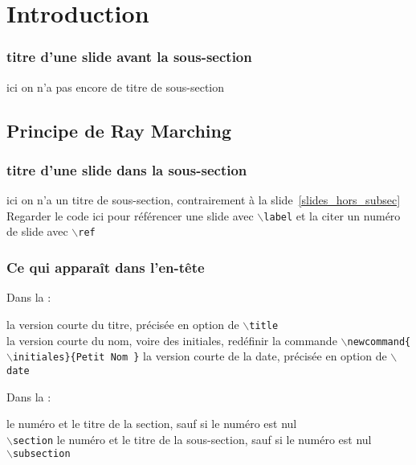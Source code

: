\section[Première section]{Introduction}
\begin{frame}
\frametitle{titre d'une slide avant la sous-section\esp}
ici on n'a pas encore de titre de sous-section
\label{slides_hors_subsec}
\end{frame}


\subsection{Principe de Ray Marching}
\begin{frame}
\frametitle{titre d'une slide dans la sous-section\esp}
ici on n'a un titre de sous-section, contrairement à la slide~\ref{slides_hors_subsec}\\[2cm]
Regarder le code ici pour référencer une slide avec \texttt{$\backslash$label} et la citer un numéro de slide avec  \texttt{$\backslash$ref}
\end{frame}


\begin{frame}
\frametitle{Ce qui apparaît dans l'en-tête}

Dans la :
\begin{itemize}
\flch la version courte du titre, précisée en option  de  \texttt{$\backslash$title}\\
\flch la version courte du nom, voire des initiales, redéfinir la commande
\texttt{$\backslash$newcommand\{$\backslash$initiales\}\{Petit Nom \}} 
\flch la version courte de la date, précisée en option de \texttt{$\backslash$date}\\
\end{itemize}
\bigskip
Dans la :
\begin{itemize}
\flch le numéro et le titre de la section, sauf si le numéro est nul\\
 \texttt{$\backslash$section}
\flch le numéro et le titre de la sous-section, sauf si le numéro est nul\\
 \texttt{$\backslash$subsection}
\end{itemize}

\end{frame}


